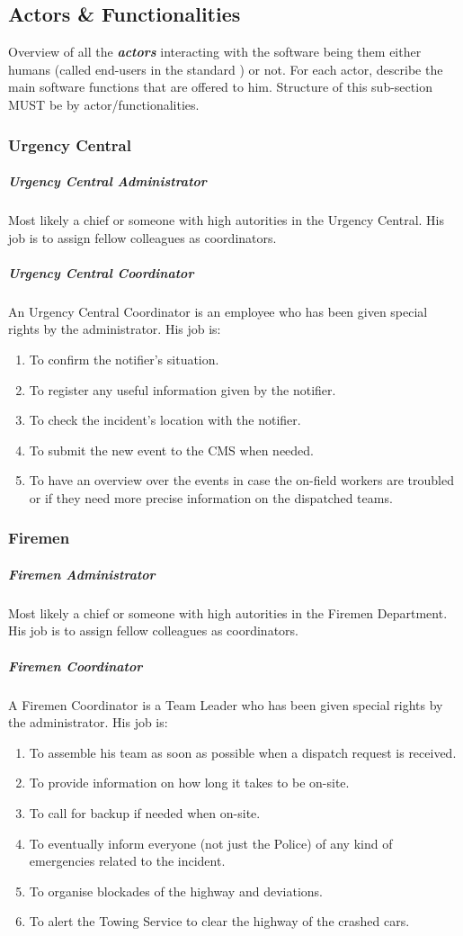 \subsection{Actors \& Functionalities}
Overview of all the \textbf{\emph{\glspl{actor}}} interacting with the software
being them either humans (called end-users in the standard
\cite{IEEE-2001-userdocumentation}) or not. For each actor, describe the main
software functions that are offered to him. Structure of this sub-section MUST
be by actor/functionalities.



\subsubsection{Urgency Central}
\subparagraph{Urgency Central Administrator}
Most likely a chief or someone with high autorities in the Urgency Central. His
job is to assign fellow colleagues as coordinators.

\subparagraph{Urgency Central Coordinator}
An Urgency Central Coordinator is an employee who has been given special rights
by the administrator. His job is:

\begin{enumerate}
\item To confirm the notifier's situation.
\item To register any useful information given by the notifier.
\item To check the incident's location with the notifier.
\item To submit the new event to the CMS when needed.
\item To have an overview over the events in case the on-field workers are
troubled or if they need more precise information on the dispatched teams.
\end{enumerate}



\subsubsection{Firemen}
\subparagraph{Firemen Administrator}
Most likely a chief or someone with high autorities in the Firemen Department.
His job is to assign fellow colleagues as coordinators.

\subparagraph{Firemen Coordinator}
A Firemen Coordinator is a Team Leader who has been given special
rights by the administrator. His job is:

\begin{enumerate}
\item To assemble his team as soon as possible when a dispatch request is
received.
\item To provide information on how long it takes to be on-site.
\item To call for backup if needed when on-site.
\item To eventually inform everyone (not just the Police) of any kind of
emergencies related to the incident.
\item To organise blockades of the highway and deviations.
\item To alert the Towing Service to clear the highway of the crashed cars.
\end{enumerate}

